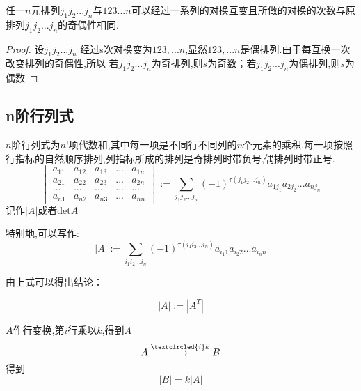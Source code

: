 \documentclass[blue,normal,cn]{elegantnote}
\begin{document}
\begin{theorem}
任一$n$元排列$j_1j_2...j_n$与$123...n$可以经过一系列的对换互变且所做的对换的次数与原排列$j_1j_2...j_n$的奇偶性相同.
\end{theorem}
\begin{proof}
设$j_1j_2...j_n$ 经过s次对换变为$123,...n$,显然$123,...n$是偶排列.由于每互换一次改变排列的奇偶性,所以
若$j_1j_2...j_n$为奇排列,则$s$为奇数；若$j_1j_2...j_n$为偶排列,则$s$为偶数
\end{proof}


\subsection{n阶行列式}

\begin{definition}[$n$阶行列式]
$n$阶行列式为$n!$项代数和,其中每一项是不同行不同列的$n$个元素的乘积.每一项按照行指标的自然顺序排列,列指标所成的排列是奇排列时带负号,偶排列时带正号.
$$
\begin{vmatrix} 
    a_{11}&a_{12} & a_{13} &...& a_{1n}\\
    a_{21}&a_{22} & a_{23} &...& a_{2n}\\
    ...&...&...&...&...\\
    a_{n1}&a_{n2} & a_{n3} &...& a_{nn}
\end{vmatrix}
:=\sum_{j_1j_2...j_n}(-1)^{\tau(j_1j_2...j_n)}a_{1j_1}a_{2j_2}...a_{nj_n}
$$
记作$|A|$或者$\mathrm {det}A$
\end{definition}

特别地,可以写作:
$$
|A|:=\sum_{i_1i_2...i_n}(-1)^{\tau(i_1 i_2...i_n)}a_{i_1 1}a_{i_2 2}...a_{i_n n}
$$

由上式可以得出结论：
\begin{property}
$$
    |A|:=|A^T|
$$
\end{property}

\begin{property}
$A$作行变换,第$i$行乘以$k$,得到$A$
    $$
        A\stackrel{\textcircled{i}k}{\longrightarrow}B
    $$
得到
    $$
        |B|=k|A|
    $$
\end{property}
\end{document}
